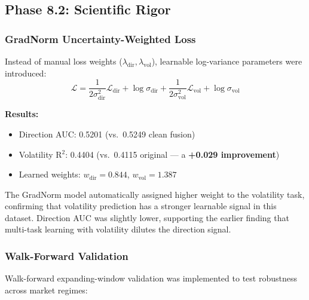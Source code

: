 \documentclass[12pt,a4paper]{article}
\begin{document}
\subsection{Phase 8.2: Scientific Rigor}
\label{sec:v2phase2}

\subsubsection{GradNorm Uncertainty-Weighted Loss}

Instead of manual loss weights ($\lambda_{\text{dir}}, \lambda_{\text{vol}}$), learnable log-variance parameters were introduced:
\begin{equation}
\mathcal{L} = \frac{1}{2\sigma_{\text{dir}}^2}\mathcal{L}_{\text{dir}} + \log\sigma_{\text{dir}} + \frac{1}{2\sigma_{\text{vol}}^2}\mathcal{L}_{\text{vol}} + \log\sigma_{\text{vol}}
\end{equation}

\textbf{Results:}
\begin{itemize}[noitemsep]
    \item Direction AUC: 0.5201 (vs.\ 0.5249 clean fusion)
    \item Volatility R$^2$: 0.4404 (vs.\ 0.4115 original --- a \textbf{+0.029 improvement})
    \item Learned weights: $w_{\text{dir}} = 0.844$, $w_{\text{vol}} = 1.387$
\end{itemize}

The GradNorm model automatically assigned higher weight to the volatility task, confirming that volatility prediction has a stronger learnable signal in this dataset. Direction AUC was slightly lower, supporting the earlier finding that multi-task learning with volatility dilutes the direction signal.

\subsubsection{Walk-Forward Validation}

Walk-forward expanding-window validation was implemented to test robustness across market regimes:
\end{document}
